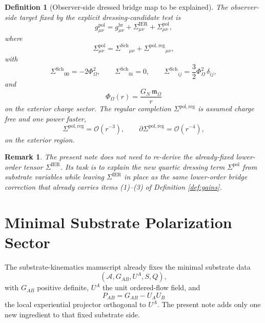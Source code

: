 \documentclass[11pt]{article}
\newcommand{\Sub}{\mathcal{A}}
\newcommand{\ReBridge}{g^{\mathrm{br}}}
\newcommand{\OpMetricPol}{g^{\mathrm{pol}}}
\newcommand{\SigmaIER}{\Sigma^{\mathrm{IER}}}
\newcommand{\SigmaPol}{\Sigma^{\mathrm{pol}}}
\newcommand{\SigmaDressSch}{\Sigma^{\mathrm{Sch}}}
\newcommand{\SigmaRegPol}{\Sigma^{\mathrm{pol,reg}}}
\newcommand{\ProjSub}{P}
\newcommand{\FlowPot}{\Phi_\Omega}
\newcommand{\HamChargeOmega}{\mathfrak m_{\Omega}}
\newtheorem{definition}{Definition}
\newtheorem{remark}{Remark}
\begin{document}
\begin{definition}[Observer-side dressed bridge map to be explained]
\label{def:target}
The observer-side target fixed by the explicit dressing-candidate test is
\begin{equation}
\OpMetricPol_{\mu\nu}
=
\ReBridge_{\mu\nu}
+\SigmaIER_{\mu\nu}
+\SigmaPol_{\mu\nu},
\label{eq:targetmetric}
\end{equation}
where
\begin{equation}
\SigmaPol_{\mu\nu}
=
\SigmaDressSch{}_{\mu\nu}
+\SigmaRegPol{}_{\mu\nu},
\label{eq:targetsplit}
\end{equation}
with
\begin{equation}
\SigmaDressSch{}_{00}=-2\FlowPot^2,
\qquad
\SigmaDressSch{}_{0i}=0,
\qquad
\SigmaDressSch{}_{ij}=\frac32\FlowPot^2\,\delta_{ij},
\label{eq:schdress}
\end{equation}
and
\begin{equation}
\FlowPot(r)=\frac{G_N\,\HamChargeOmega}{r}
\label{eq:phiext}
\end{equation}
on the exterior charge sector. The regular completion \(\SigmaRegPol\) is assumed charge free and one power faster,
\begin{equation}
\SigmaRegPol=\mathcal O(r^{-3}),
\qquad
\partial\SigmaRegPol=\mathcal O(r^{-4}),
\label{eq:reg}
\end{equation}
on the exterior region.
\end{definition}

\begin{remark}
The present note does not need to re-derive the already-fixed lower-order tensor \(\SigmaIER\). Its task is to explain the new quartic dressing term \(\SigmaPol\) from substrate variables while leaving \(\SigmaIER\) in place as the same lower-order bridge correction that already carries items (1)--(3) of Definition \ref{def:gains}.
\end{remark}

\section{Minimal Substrate Polarization Sector}

The substrate-kinematics manuscript already fixes the minimal substrate data
\[
(\Sub,G_{AB},U^A,S,Q),
\]
with \(G_{AB}\) positive definite, \(U^A\) the unit ordered-flow field, and
\begin{equation}
\ProjSub_{AB}=G_{AB}-U_AU_B
\label{eq:projector}
\end{equation}
the local experiential projector orthogonal to \(U^A\). The present note adds only one new ingredient to that fixed substrate side.
\end{document}
